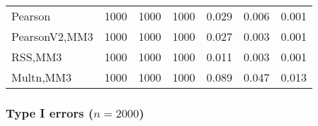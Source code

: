 \documentclass[
]{article}
\begin{document}
\begin{table}[H]
{\begin{tabular}[t]{lrrrrrr}
\hspace{1em}Pearson & 1000 & 1000 & 1000 & 0.029 & 0.006 & 0.001\\
\hspace{1em}PearsonV2,MM3 & 1000 & 1000 & 1000 & 0.027 & 0.003 & 0.001\\
\hspace{1em}RSS,MM3 & 1000 & 1000 & 1000 & 0.011 & 0.003 & 0.001\\
\hspace{1em}Multn,MM3 & 1000 & 1000 & 1000 & 0.089 & 0.047 & 0.013\\
\bottomrule
\end{tabular}}
\end{table}

\hypertarget{type-i-errors-n2000-2}{%
\subsubsection{\texorpdfstring{Type I errors
(\(n=2000\))}{Type I errors (n=2000)}}\label{type-i-errors-n2000-2}}
\end{document}
